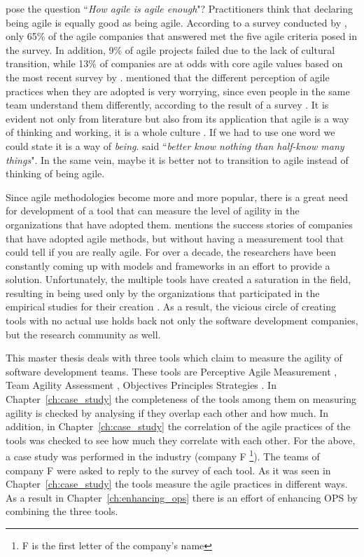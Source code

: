 \citet{comparative_agility} pose the question ``\textit{How agile is agile enough}"? Practitioners think that declaring being agile is equally good as being agile. According to a survey conducted by \citet{ambysoft}, only 65\% of the agile companies that answered met the five agile criteria posed in the survey. In addition, 9\% of agile projects failed due to the lack of cultural transition, while 13\% of companies are at odds with core agile values based on the most recent survey by \citet{versionOne}. \citet{poonacha} mentioned that the different perception of agile practices when they are adopted is very worrying, since even people in the same team understand them differently, according to the result of a survey \cite{ambler}. It is evident not only from literature but also from its application that agile is a way of thinking and working, it is a whole culture \cite{poonacha}. If we had to use one word we could state it is a way of \textit{being}. \citet{Nietzsche} said ``\textit{better know nothing than half-know many things}". In the same vein, maybe it is better not to transition to agile instead of thinking of being agile. 

Since agile methodologies become more and more popular, there is a great need for development of a tool that can measure the level of agility in the organizations that have adopted them. \citet{sidky} mentions the success stories of companies that have adopted agile methods, but without having a measurement tool that could tell if you are really agile. For over a decade, the researchers have been constantly coming up with models and frameworks in an effort to provide a solution. Unfortunately, the multiple tools have created a saturation in the field, resulting in being used only by the organizations that participated in the empirical studies for their creation \cite{samireh_jalali_dissertation}\cite{Jalali2014}. As a result, the vicious circle of creating tools with no actual use holds back not only the software development companies, but the research community as well.

This master thesis deals with three tools which claim to measure the agility of software development teams. These tools are Perceptive Agile Measurement \cite{pam}, Team Agility Assessment \cite{Leffingwell}, Objectives Principles Strategies \cite{sventha_dissertation}. In Chapter~\ref{ch:case_study} the completeness of the tools among them on measuring agility is checked by analysing if they overlap each other and how much. In addition, in Chapter~\ref{ch:case_study} the correlation of the agile practices of the tools was checked to see how much they correlate with each other. For the above, a case study was performed in the industry (company F \footnote{F is the first letter of the company's name}). The teams of company F were asked to reply to the survey of each tool. As it was seen in Chapter~\ref{ch:case_study} the tools measure the agile practices in different ways. As a result in Chapter~\ref{ch:enhancing_ops} there is an effort of enhancing OPS by combining the three tools.

